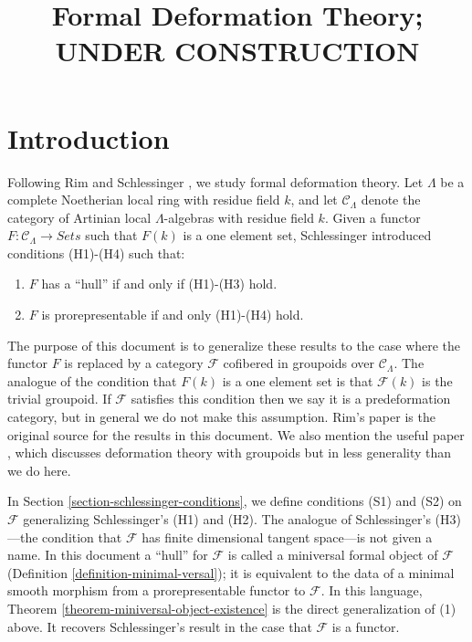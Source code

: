 


%


\title{Formal Deformation Theory; UNDER CONSTRUCTION}


\maketitle

\label{section-phantom}

\tableofcontents



\section{Introduction}
\label{section-introduction}

\noindent
Following Rim \cite[Exposee VI]{SGA7-I} and Schlessinger \cite{Sch}, we 
study formal deformation theory. Let $\Lambda$ be a complete Noetherian
local ring with residue field $k$, and let $\mathcal{C}_\Lambda$ denote
the category of Artinian local $\Lambda$-algebras with residue field $k$.
Given a functor $F : \mathcal{C}_\Lambda \to \textit{Sets}$ such that $F(k)$
is a one element set, Schlessinger \cite{Sch} introduced conditions 
(H1)-(H4) such that: 
\begin{enumerate}
\item $F$ has a ``hull'' if and only if (H1)-(H3) hold.
\item $F$ is prorepresentable if and only (H1)-(H4) hold.
\end{enumerate} 
The purpose of this document is to generalize these results to the case where 
the functor $F$ is replaced by a category $\mathcal{F}$ cofibered in groupoids 
over $\mathcal{C}_\Lambda$.  The analogue of the condition that $F(k)$ is a 
one element set is that $\mathcal{F}(k)$ is the trivial groupoid. If
$\mathcal{F}$ satisfies this condition then we say it is a predeformation
category, but in  general we do not make this assumption.  Rim's paper
\cite[Exposee VI]{SGA7-I} is the original 
source for the results in this document.  We also mention the useful paper 
\cite{Vistoli}, which discusses deformation theory with groupoids but in less 
generality than we do here.
  
\medskip \noindent
In
Section \ref{section-schlessinger-conditions},
we define conditions (S1) and (S2) 
on $\mathcal{F}$ generalizing Schlessinger's (H1) and (H2).  The analogue of 
Schlessinger's (H3)---the condition that $\mathcal{F}$ has finite dimensional 
tangent space---is not given a name.  In this document a ``hull'' for $\mathcal 
F$ is called a miniversal formal object of $\mathcal{F}$
(Definition \ref{definition-minimal-versal});
it is equivalent to the data of a minimal 
smooth morphism from a prorepresentable functor to $\mathcal{F}$.  In this 
language, Theorem \ref{theorem-miniversal-object-existence} is the direct 
generalization of (1) above. It recovers Schlessinger's result in the case that 
$\mathcal{F}$ is a functor.


